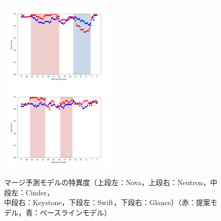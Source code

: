 \documentclass[submit]{ipsj}
\begin{document}
\begin{figure}[t]
\begin{minipage}{\textwidth}
\begin{center}
    \includegraphics[width=0.495\textwidth]{Uenaka_fig/RQ2_result/Swift/Swift_merge_Specificity.pdf}
    \includegraphics[width=0.495\textwidth]{Uenaka_fig/RQ2_result/Glance/Glance_merge_Specificity.pdf}
    \caption{マージ予測モデルの特異度（上段左：Nova，上段右：Neutron，中段左：Cinder，\\ 中段右：Keystone，下段左：Swift，下段右：Glance）（赤：提案モデル，青：ベースラインモデル）}
    \label{fig:merge_spec}
\end{center}
\vspace{0.08\textheight}
\end{minipage}
\end{figure}
\end{document}
